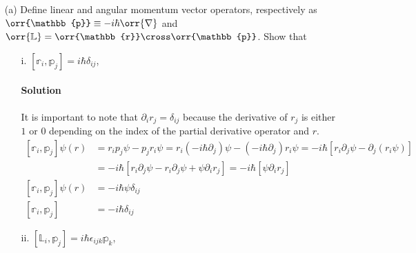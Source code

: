 \documentclass{article}
\begin{document}
{\begin{enumerate}
\begin{enumerate}
				\paragraph{Solution} \unboldmath Adding $ - B_k A_j + B_k A_j $ does nothing to the overall equation as it is essentially zero.
				\begin{equation*}
					\begin{split}
						\left( \orr{A} \cross \orr{B} \right)_i &= \epsilon_{ijk} A_j B_k = \epsilon_{ijk} \left( A_j B_k - B_k A_j + B_k A_j \right) \\
						&= \epsilon_{ijk} \left[ A_j , B_k \right] + \epsilon_{ijk} B_k A_j \\
						&= -\epsilon_{ikj} B_k A_j + \epsilon_{ijk} \left[ A_j , B_k \right] \\
						&= -\left( \orr{B} \cross \orr{A} \right)_i + \epsilon_{ijk} \left[ A_j , B_k \right]
					\end{split}
				\end{equation*} \boldmath
			\end{enumerate}
			\item[(a)] Define linear and angular momentum vector operators, respectively as $ \orr{\mathbb{p}} \equiv -i\hbar \orr{\nabla} $ and $ \orr{\mathbb{L}} = \orr{\mathbb{r}} \cross \orr{\mathbb{p}} $. Show that 
			\begin{enumerate}
				\item[i.] $ \left[ \mathbb{r}_i , \mathbb{p}_j \right] = i\hbar \delta_{ij} $,
				\paragraph{Solution} It is important to note that $\partial_i r_j = \delta_{ij}$ because the derivative of $r_j$ is either $1$ or $0$ depending on the index of the partial derivative operator and $r$. \unboldmath
					\begin{equation*}
						\begin{split}
							\left[ \mathbb{r}_i , \mathbb{p}_j \right] \psi(r) &= r_i p_j \psi - p_j r_i \psi = r_i \left( -i\hbar \partial_j \right) \psi - \left( -i\hbar \partial_j \right) r_i \psi = -i\hbar \left[ r_i \partial_j \psi - \partial_j \left( r_i \psi \right) \right] \\
							&= -i\hbar \left[ r_i \partial_j \psi - r_i \partial_j \psi + \psi \partial_i r_j  \right] = -i\hbar \left[ \psi \partial_i r_j  \right] \\
							\left[ \mathbb{r}_i , \mathbb{p}_j \right] \psi(r) &= -i\hbar \psi \delta_{ij} \\
							\left[ \mathbb{r}_i , \mathbb{p}_j \right] &= -i\hbar \delta_{ij}
						\end{split}
					\end{equation*} \boldmath
				\item[ii.] $ \left[ \mathbb{L}_i , \mathbb{p}_j \right] = i\hbar \epsilon_{ijk} \mathbb{p}_k $,

\end{enumerate}
\end{enumerate}}
\end{document}
